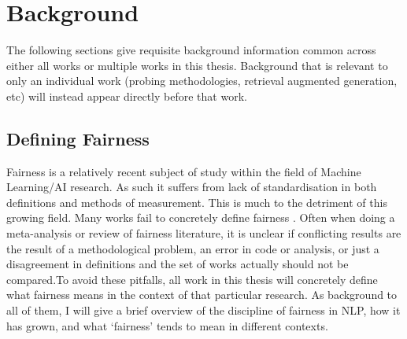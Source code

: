 \chapter{Background}\label{chapter:background}

The following sections give requisite background information common across either all works or multiple works in this thesis. Background that is relevant to only an individual work (probing methodologies, retrieval augmented generation, etc) will instead appear directly before that work.

\section{Defining Fairness}
Fairness is a relatively recent subject of study within the field of Machine Learning/AI research. As such it suffers from lack of standardisation in both definitions and methods of measurement. This is much to the detriment of this growing field. Many works fail to concretely define fairness \citep{blodgett-etal-2020-language, goldfarb-tarrant-etal-2023-prompt}. Often when doing a meta-analysis or review of fairness literature, it is unclear if conflicting results are the result of a methodological problem, an error in code or analysis, or just a disagreement in definitions and the set of works actually should not be compared.To avoid these pitfalls, all work in this thesis will concretely define what fairness means in the context of that particular research. As background to all of them, I will give a brief overview of the discipline of fairness in NLP, how it has grown, and what `fairness' tends to mean in different contexts. 
